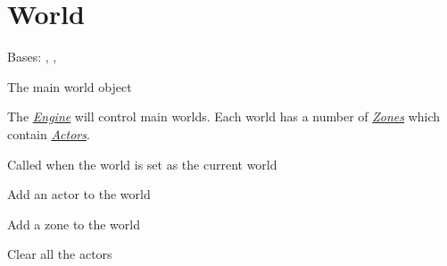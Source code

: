\documentclass[letterpaper,10pt,english]{sphinxmanual}
\begin{document}
\label{world:module-world}

\section{World}
\label{world:world}

\begin{fulllineitems}
\label{world:serge.world.World}
Bases: {\hyperref[common:serge.common.Loggable]{}}, {\hyperref[common:serge.serialize.Serializable]{}}, {\hyperref[common:serge.common.EventAware]{}}

The main world object

The {\hyperref[engine::doc]{\emph{Engine}}} will control main worlds. Each world has a number
of {\hyperref[zone::doc]{\emph{Zones}}} which contain {\hyperref[actor::doc]{\emph{Actors}}}.

\begin{fulllineitems}
\label{world:serge.world.World.activateWorld}
Called when the world is set as the current world

\end{fulllineitems}


\begin{fulllineitems}
\label{world:serge.world.World.addActor}
Add an actor to the world

\end{fulllineitems}


\begin{fulllineitems}
\label{world:serge.world.World.addZone}
Add a zone to the world

\end{fulllineitems}


\begin{fulllineitems}
\label{world:serge.world.World.clearActors}
Clear all the actors


\end{fulllineitems}
\end{fulllineitems}
\end{document}
